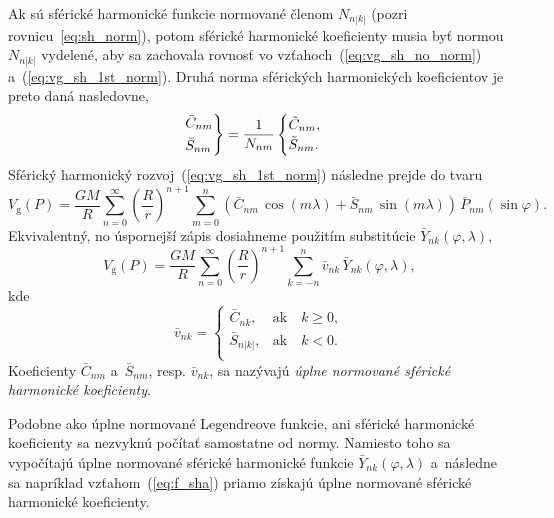 \documentclass[a4paper, 12pt]{book}
\newcommand{\gidx}{\mathrm g}
\begin{document}
Ak sú sférické harmonické funkcie normované členom $N_{n|k|}$ (pozri 
rovnicu~\ref{eq:sh_norm}), potom sférické harmonické koeficienty musia byť 
normou $N_{n|k|}$ vydelené, aby sa zachovala rovnosť vo 
vzťahoch~(\ref{eq:vg_sh_no_norm}) a~(\ref{eq:vg_sh_1st_norm}).  Druhá norma 
sférických harmonických koeficientov je preto daná nasledovne,
%
\begin{equation}
\label{eq:cnm_snm_2nd_norm}
\begin{rcases}
\bar{C}_{nm}\\
\bar{S}_{nm}
\end{rcases}
= \frac{1}{N_{nm}}
\begin{cases}
\tilde{C}_{nm}{,}\\
\tilde{S}_{nm}{.}
\end{cases}
\end{equation}
%
Sférický harmonický rozvoj~(\ref{eq:vg_sh_1st_norm}) následne prejde do tvaru
%
\begin{equation}
\label{eq:vg_sh_2nd_norm}
V_\gidx(P) = \frac{GM}{R} \sum_{n = 0}^\infty \left( \frac{R}{r} \right)^{n
+ 1} \sum_{m = 0}^{n} \left( \bar{C}_{nm} \, \cos(m\lambda) + \bar{S}_{nm} \,
\sin(m\lambda)\right) \, \bar{P}_{nm}(\sin\varphi){.}
\end{equation}
%
Ekvivalentný, no úspornejší zápis dosiahneme použitím substitúcie
$\bar{Y}_{nk}(\varphi, \lambda)$,
%
\begin{equation}
\label{eq:vg_sh_2nd_norm_ynk}
V_\gidx(P) = \frac{GM}{R} \sum_{n = 0}^\infty \left( \frac{R}{r} \right)^{n
+ 1} \sum_{k = -n}^{n} \bar{v}_{nk} \, \bar{Y}_{nk}(\varphi, \lambda){,}
\end{equation}
kde
%
\begin{equation}
\bar{v}_{nk} =
%
\begin{cases}
\bar{C}_{nk}{,}    &\text{ak} \quad k \geq 0{,}\\
\bar{S}_{n|k|}{,}  &\text{ak} \quad k < 0{.}\\
\end{cases}
\end{equation}
%
Koeficienty $\bar{C}_{nm}$ a~$\bar{S}_{nm}$, resp. $\bar{v}_{nk}$, sa nazývajú
\emph{úplne normované sférické harmonické koeficienty}.

Podobne ako úplne normované Legendreove funkcie, ani sférické
harmonické koeficienty sa nezvyknú počítať samostatne od normy.  Namiesto toho
sa vypočítajú úplne normované sférické harmonické funkcie
$\bar{Y}_{nk}(\varphi, \lambda)$ a~následne sa napríklad
vzťahom~(\ref{eq:f_sha}) priamo získajú úplne normované sférické harmonické
koeficienty.
\end{document}
